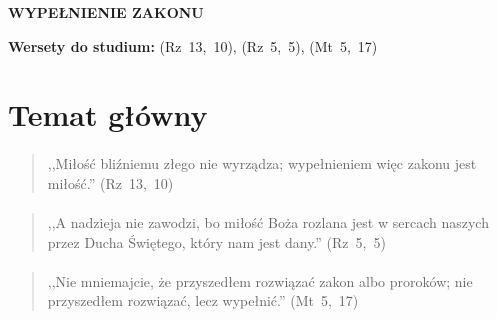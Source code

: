 \documentclass[10pt,a4paper,oneside]{article}
\begin{document}
\centerline{\textbf{\MakeUppercase{Wypełnienie zakonu}}}
\begin{center}
\textbf{Wersety do studium:} \mbox{(Rz 13, 10)}, \mbox{(Rz 5, 5)}, \mbox{(Mt 5, 17)}
\end{center}
\section{Temat główny}
\paragraph{}
\begin{quote}
,,Miłość bliźniemu złego nie wyrządza; wypełnieniem więc zakonu jest miłość.'' \mbox{(Rz 13, 10)}
\end{quote}
\paragraph{}
\begin{quote}
,,A nadzieja nie zawodzi, bo miłość Boża rozlana jest w sercach naszych przez Ducha Świętego, który nam jest dany.'' \mbox{(Rz 5, 5)}
\end{quote}
\paragraph{}
\begin{quote}
,,Nie mniemajcie, że przyszedłem rozwiązać zakon albo proroków; nie przyszedłem rozwiązać, lecz wypełnić.'' \mbox{(Mt 5, 17)}
\end{quote}
\end{document}
